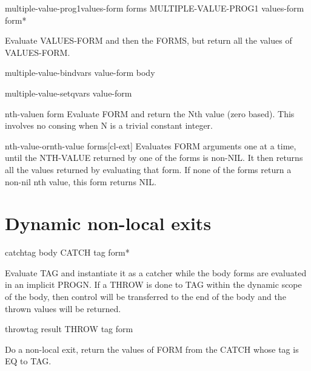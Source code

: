 \documentclass[10pt,english]{book}
\begin{document}
\begin{specialop}{multiple-value-prog1}{values-form \rest forms}
  MULTIPLE-VALUE-PROG1 values-form form*

Evaluate VALUES-FORM and then the FORMS, but return all the values of
VALUES-FORM.
\end{specialop}

\begin{macro}{multiple-value-bind}{vars value-form \body body}
  
\end{macro}

\begin{macro}{multiple-value-setq}{vars value-form}
  
\end{macro}

\begin{macro}{nth-value}{n form}
  Evaluate FORM and return the Nth value (zero based). This involves no
  consing when N is a trivial constant integer.
\end{macro}

\begin{macro}{nth-value-or}{nth-value \body forms}[cl-ext]
  Evaluates FORM arguments one at a time, until the NTH-VALUE returned by one
of the forms is non-NIL. It then returns all the values returned by evaluating
that form. If none of the forms return a non-nil nth value, this form returns
NIL.
\end{macro}

\section{Dynamic non-local exits}
\label{sec:dynamic-non-local}

\begin{specialop}{catch}{tag \body body}
  CATCH tag form*

Evaluate TAG and instantiate it as a catcher while the body forms are
evaluated in an implicit PROGN. If a THROW is done to TAG within the dynamic
scope of the body, then control will be transferred to the end of the body and
the thrown values will be returned.
\end{specialop}

\begin{specialop}{throw}{tag result}
  THROW tag form

Do a non-local exit, return the values of FORM from the CATCH whose tag is EQ
to TAG.
\end{specialop}
\end{document}
